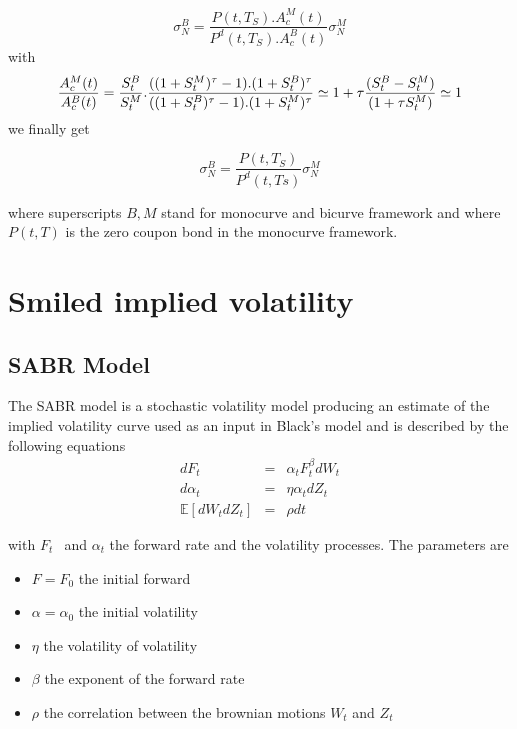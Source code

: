 \documentclass[3pt]{article}
\begin{document}
\begin{equation*}
\sigma _{N}^{B}=\frac{P(t,T_{S}).A_{c}^{M}(t)}{P^{d}(t,T_{S}).A_{c}^{B}(t)}%
\sigma _{N}^{M}
\end{equation*}%
with%
\begin{equation*}
\frac{A_{c}^{M}(t)}{A_{c}^{B}(t)}=\frac{S_{t}^{B}}{S_{t}^{M}}.\frac{%
((1+S_{t}^{M})^{\tau }-1).(1+S_{t}^{B})^{\tau }}{((1+S_{t}^{B})^{\tau
}-1).(1+S_{t}^{M})^{\tau }}\overset{}{\simeq }1+\tau \frac{%
(S_{t}^{B}-S_{t}^{M})}{(1+\tau S_{t}^{M})}\simeq 1
\end{equation*}%
we finally get

\begin{equation*}
\sigma _{N}^{B}=\frac{P(t,T_{S})}{P^{d}(t,Ts)}\sigma _{N}^{M}
\end{equation*}

where superscripts $B,M$ stand for monocurve and bicurve framework and where 
$P(t,T)$ is the zero coupon bond in the monocurve framework.

\bigskip

\section{Smiled implied volatility}

\subsection{SABR Model}

The SABR model is a stochastic volatility model producing an estimate of the
implied volatility curve used as an input in Black's model and is described
by the following equations%
\begin{eqnarray*}
dF_{t} &=&\alpha _{t}F_{t}^{\beta }dW_{t} \\
d\alpha _{t} &=&\eta \alpha _{t}dZ_{t} \\
\mathbb{E}\left[ dW_{t}dZ_{t}\right] &=&\rho dt
\end{eqnarray*}

with $F_{t\text{ }}$ and $\alpha _{t}$ the forward rate and the volatility
processes. The parameters are

\bigskip

\begin{itemize}
\item $F=F_{0}$ the initial forward

\item $\alpha =\alpha _{0}$ the initial volatility

\item $\eta $ the volatility of volatility

\item $\beta $ the exponent of the forward rate

\item $\rho $ the correlation between the brownian motions $W_{t}$ and $%
Z_{t} $
\end{itemize}
\end{document}
